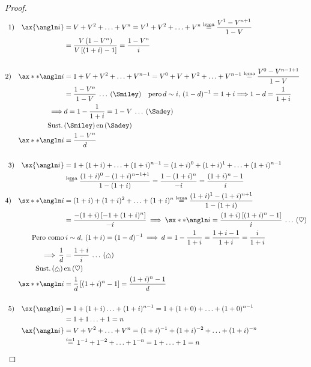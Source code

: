 \begin{proof}
\begin{align*}
1) \quad \ax{\angln i} &= V + V^2 + \ldots + V^n = V^1 + V^2 + \ldots + V^n \mathrel{\stackon[1pt]{$=$}{$\scriptstyle \text{lema}$}} \frac{V^1 - V^{n+1}}{1-V}\\
&= \frac{V\left(1-V^n\right)}{V\left[(1+i) -1\right]} = \frac{1-V^n}{i}\\
&\hfill \\
2) \quad \ax**{\angln i} &= 1 + V + V^2 + \ldots + V^{n-1} = V^0 + V + V^2 + \ldots + V^{n-1} \mathrel{\stackon[1pt]{$=$}{$\scriptstyle \text{lema}$}} \frac{V^0 - V^{n-1+1}}{1-V}\\
&= \frac{1-V^n}{1-V} \: \ldots \: (\Smiley) \quad \text{pero} \, d\sim i, \, (1-d)^{-1} = 1+i \Longrightarrow 1-d = \frac{1}{1+i}\\
\Longrightarrow \: &d = 1 - \frac{1}{1+i} = 1 - V \: \ldots \: (\Sadey)\\
\text{Sust.}\, &(\Smiley) \, \text{en} \, (\Sadey)\\
\ax**{\angln i} &= \frac{1-V^n}{d}\\
&\hfill \\
3) \quad \sx{\angln i} &= 1+(1+i) + \ldots + (1+i)^{n-1} = (1+i)^0 + (1+i)^1 + \ldots + (1+i)^{n-1}\\
& \mathrel{\stackon[1pt]{$=$}{$\scriptstyle \text{lema}$}} \frac{(1+i)^0 - (1+i)^{n-1+1}}{1-(1+i)} = \frac{1-(1+i)^n}{-i} = \frac{(1+i)^n - 1}{i}\\
4) \quad \sx**{\angln i} &= (1+i) + (1+i)^2 + \ldots +(1+i)^n \mathrel{\stackon[1pt]{$=$}{$\scriptstyle \text{lema}$}} \frac{(1+i)^1 - (1+i)^{n+1}}{1-(1+i)} \\
& = \frac{-(1+i)\left[-1 + (1+i)^n \right] }{-i} \: \Longrightarrow \: \sx**{\angln i} = \frac{(1+i)\left[(1+i)^n - 1\right] }{i} \: \ldots \: (\heartsuit)\\
\text{Pero como} &\: i\sim d, \, (1+i)=(1-d)^{-1} \: \Longrightarrow \: d=1- \frac{1}{1+i} = \frac{1+i-1}{1+i} = \frac{i}{1+i}\\
\Longrightarrow\: \frac{1}{d} &= \frac{1+i}{i} \: \ldots \: (\rotatebox[origin=c]{180}{\ensuremath\heartsuit})\\
\text{Sust.}\, (\rotatebox[origin=c]{180}{\ensuremath\heartsuit}) \, &\text{en} \, (\heartsuit)\\
\sx**{\angln i} &= \frac{1}{d}\left[(1+i)^n - 1 \right] = \frac{(1+i)^n-1}{d}\\ 
&\hfill\\
5) \quad \sx{\angln i} &= 1 + (1+i) \ldots + (1+i)^{n-1} = 1+(1+0) + \ldots + (1+0)^{n-1}\\
&= 1+1\ldots+1=n\\
\ax{\angln i} &= V+V^2+\ldots+V^n = (1+i)^{-1} + (1+i)^{-2} +\ldots + (1+i)^{-n}\\
&\mathrel{\stackon[1pt]{$=$}{$\scriptstyle i=1$}} 1^{-1} + 1^{-2} + \ldots + 1^{-n} = 1 + \ldots + 1=n
\end{align*}
\end{proof}

